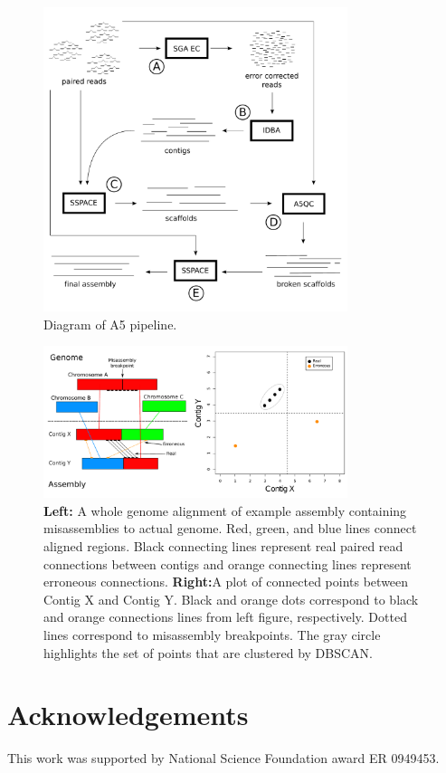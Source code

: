 \documentclass{bioinfo}
\begin{document}
\begin{figure}[t]
\includegraphics[width=3.5in]{a5pipeline-diagram.pdf}
\vspace{-1cm}
\caption{Diagram of A5 pipeline. }\label{fig:01}
\end{figure}

\begin{figure}[t]
\includegraphics[width=3.5in]{fish-qc.pdf}
\vspace{-1cm}
\caption{\textbf{Left:}  A whole genome alignment of example assembly containing misassemblies to actual genome. 
Red, green, and blue lines connect aligned regions. Black connecting lines represent real paired read 
connections between contigs and orange connecting lines represent erroneous connections. \textbf{Right:}A plot 
of connected points between Contig X and Contig Y. Black and orange dots correspond
to black and orange connections lines from left figure, respectively. Dotted lines correspond
to misassembly breakpoints. The gray circle highlights the set of points that are clustered by DBSCAN. }\label{fig:02}
\end{figure}




\section*{Acknowledgements}
This work was supported by National Science Foundation award ER 0949453.



\end{document}
